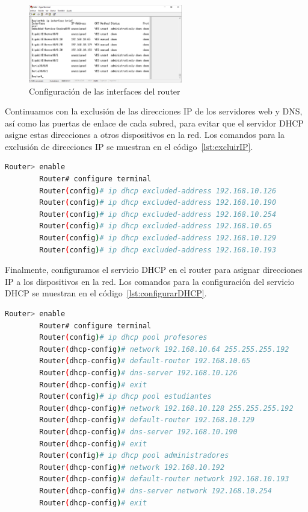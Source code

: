     \begin{figure}[H]
        \centering
        \includegraphics[width=0.6\textwidth]{img/router_VLAN.PNG}
        \caption{Configuración de las interfaces del router}
        \label{fig:configurar_interfaces}
    \end{figure}

    Continuamos con la exclusión de las direcciones IP de los servidores web y DNS, así como las puertas de enlace de cada subred, para evitar que el servidor DHCP asigne estas direcciones a otros dispositivos en la red. Los comandos para la exclusión de direcciones IP se muestran en el código~\ref{lst:excluirIP}.

    \begin{lstlisting}[language=bash, caption={Exclusión de direcciones IP en el router}, label={lst:excluirIP}]
        Router> enable
        Router# configure terminal
        Router(config)# ip dhcp excluded-address 192.168.10.126
        Router(config)# ip dhcp excluded-address 192.168.10.190
        Router(config)# ip dhcp excluded-address 192.168.10.254
        Router(config)# ip dhcp excluded-address 192.168.10.65
        Router(config)# ip dhcp excluded-address 192.168.10.129
        Router(config)# ip dhcp excluded-address 192.168.10.193
    \end{lstlisting}

    Finalmente, configuramos el servicio DHCP en el router para asignar direcciones IP a los dispositivos en la red. Los comandos para la configuración del servicio DHCP se muestran en el código~\ref{lst:configurarDHCP}.

    \begin{lstlisting}[language=bash, caption={Configuración del servicio DHCP en el router}, label={lst:configurarDHCP}]
        Router> enable
        Router# configure terminal
        Router(config)# ip dhcp pool profesores
        Router(dhcp-config)# network 192.168.10.64 255.255.255.192
        Router(dhcp-config)# default-router 192.168.10.65
        Router(dhcp-config)# dns-server 192.168.10.126
        Router(dhcp-config)# exit
        Router(config)# ip dhcp pool estudiantes
        Router(dhcp-config)# network 192.168.10.128 255.255.255.192
        Router(dhcp-config)# default-router 192.168.10.129
        Router(dhcp-config)# dns-server 192.168.10.190
        Router(dhcp-config)# exit
        Router(config)# ip dhcp pool administradores
        Router(dhcp-config)# network 192.168.10.192
        Router(dhcp-config)# default-router network 192.168.10.193
        Router(dhcp-config)# dns-server network 192.168.10.254
        Router(dhcp-config)# exit
    \end{lstlisting}

